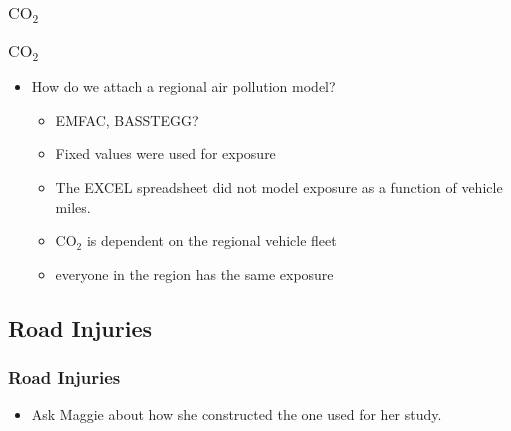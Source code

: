 \documentclass[handout,13pt,compress,c]{beamer}
\newcommand{\bi}{\begin{itemize}}
\newcommand{\ei}{\end{itemize}}
\begin{document}
\subsubsection{$\mathrm{CO}_{2}$}
\begin{frame}[fragile]
\frametitle{$\mathrm{CO}_{2}$}
\bi
\item How do we attach a regional air pollution model?
\bi\item EMFAC, BASSTEGG?\ei
\bi\item Fixed values were used for exposure
\item The EXCEL spreadsheet did not model exposure as a function of vehicle miles.\ei
\bi \item $\mathrm{CO}_{2}$ is dependent on the regional vehicle fleet
\item everyone in the region has the same exposure \ei
\ei
\end{frame}
\subsection{Road Injuries}
\begin{frame}[fragile]
\frametitle{Road Injuries}
\bi\item Ask Maggie about how she constructed the one used for her study.\ei
\end{frame}
\end{document}
